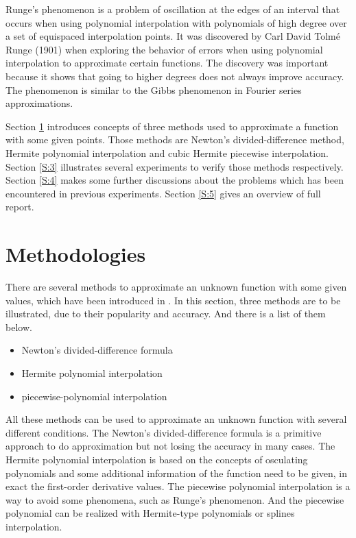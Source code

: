 \documentclass[preprint,12pt]{elsarticle}
\begin{document}
Runge's phenomenon is a problem of oscillation at the edges of an interval that occurs when using polynomial interpolation with polynomials of high degree over a set of equispaced interpolation points. It was discovered by Carl David Tolm\'e Runge (1901) when exploring the behavior of errors when using polynomial interpolation to approximate certain functions. The discovery was important because it shows that going to higher degrees does not always improve accuracy. The phenomenon is similar to the Gibbs phenomenon in Fourier series approximations.

Section \ref{S:2} introduces concepts of three methods used to approximate a function with some given points. Those methods are Newton's divided-difference method, Hermite polynomial interpolation and cubic Hermite piecewise interpolation. Section \ref{S:3} illustrates several experiments to verify those methods respectively. Section \ref{S:4} makes some further discussions about the problems which has been encountered in previous experiments. Section \ref{S:5} gives an overview of full report.

\section{Methodologies}
\label{S:2}

There are several methods to approximate an unknown function with some given values, which have been introduced in \cite{burden:2001na}. In this section, three methods are to be illustrated, due to their popularity and accuracy. And there is a list of them below.

\begin{itemize}
\item Newton's divided-difference formula
\item Hermite polynomial interpolation
\item piecewise-polynomial interpolation
\end{itemize}


All these methods can be used to approximate an unknown function with several different conditions. The Newton's divided-difference formula is a primitive approach to do approximation but not losing the accuracy in many cases. The Hermite polynomial interpolation is based on the concepts of osculating polynomials and some additional information of the function need to be given, in exact the first-order derivative values. The piecewise polynomial interpolation is a way to avoid some phenomena, such as Runge's phenomenon. And the piecewise polynomial can be realized with Hermite-type polynomials or splines interpolation.
\end{document}
